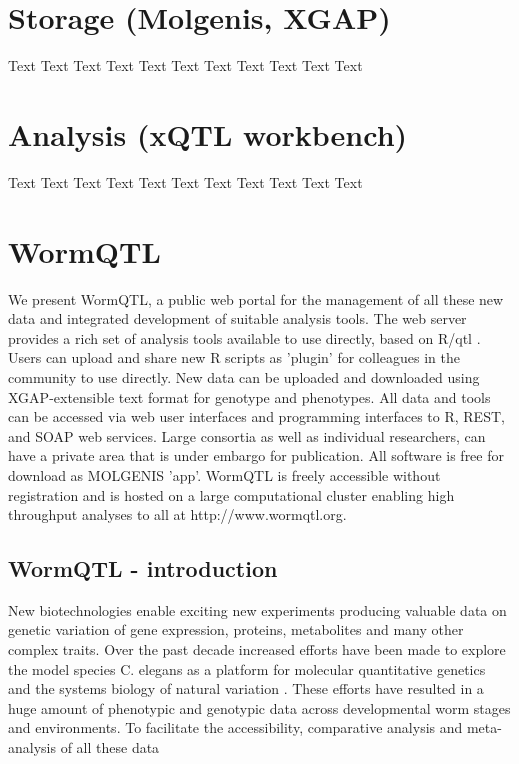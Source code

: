 \documentclass[8pt, twoside, a5paper]{report}
\begin{document}
\newpage

\section{Storage (Molgenis, XGAP)}
Text Text Text Text Text Text Text Text Text Text Text

\section{Analysis (xQTL workbench)}
Text Text Text Text Text Text Text Text Text Text Text

\section{WormQTL}
We present WormQTL, a public web portal for the management of all these new data and integrated development 
of suitable analysis tools. The web server provides a rich set of analysis tools available to use directly, 
based on R/qtl \cite{Broman:2003, Arends:2010}. Users can upload and share new R scripts as 'plugin' for 
colleagues in the community to use directly. New data can be uploaded and downloaded using XGAP-extensible 
text format for genotype and phenotypes\cite{Swertz:2010a}. All data and tools can be accessed via web user 
interfaces and programming interfaces to R, REST, and SOAP web services. Large consortia as well as individual 
researchers, can have a private area that is under embargo for publication. All software is free for download 
as MOLGENIS 'app'\cite{Swertz:2010b}. WormQTL is freely accessible without registration and is hosted on a 
large computational cluster enabling high throughput analyses to all at http://www.wormqtl.org.

  \subsection{WormQTL - introduction}
  New biotechnologies enable exciting new experiments producing valuable data on genetic variation of gene 
  expression, proteins, metabolites and many other complex traits. Over the past decade increased efforts 
  have been made to explore the model species C. elegans as a platform for molecular quantitative genetics 
  and the systems biology of natural variation \cite{Gaertner:2010, Kammenga:2008}. These efforts have 
  resulted in a huge amount of phenotypic and genotypic data across developmental worm stages and environments. 
  To facilitate the accessibility, comparative analysis and meta-analysis of all these data \cite{Swertz:2007} 
\end{document}
